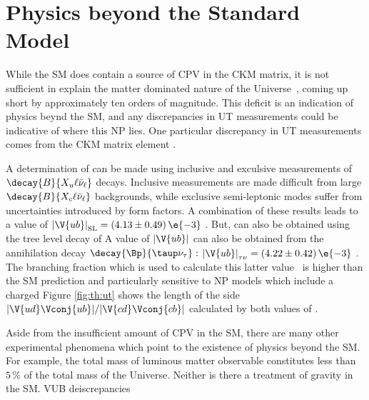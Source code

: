 \section{Physics beyond the Standard Model}

While the SM does contain a source of CPV in the CKM matrix, it is not sufficient in explain the
matter dominated nature of the Universe~\cite{Cline:2006ts,Huet:1994jb}, coming up short by
approximately ten orders of magnitude.
This deficit is an indication of physics beynd the SM, and any discrepancies in UT measurements
could be indicative of where this NP lies.
One particular discrepancy in UT measurements comes from the CKM matrix element .

A determination of 
can be made using inclusive and exculsive measurements of
$\decay{B}{X_u\ell\bar\nu_\ell}$ decays.
Inclusive measurements are made difficult from large
$\decay{B}{X_c\ell\bar\nu_\ell}$ backgrounds, while exclusive semi-leptonic modes suffer from
uncertainties introduced by form factors.
A combination of these results leads to a value of
$\left|\V{ub}\right|_\mathrm{SL}=\left(4.13\pm0.49\right)\e{-3}$ \cite{PDG2012}.
But,  can also be obtained using the tree level decay of
A value of $\left|\V{ub}\right|$ can also be obtained from the annihilation decay
$\decay{\Bp}{\taup\nu_\tau}:$
$\left|\V{ub}\right|_{\tau\nu}=\left(4.22\pm0.42\right)\e{-3}$ \cite{PDG2012}.
The branching fraction which is used to calculate this latter value~\cite{Amhis:2012bh} is
higher than the SM prediction and particularly sensitive to NP models which include a charged
Figure \ref{fig:th:ut} shows the length of the side $|\V{ud}\Vconj{ub}|/|\V{cd}\Vconj{cb}|$
calculated by both values of .

Aside from the insufficient amount of CPV in the SM,
there are many other experimental phenomena which point to the existence of physics beyond the SM.
For example, the total mass of luminous matter observable constitutes less than $5\,\%$ of the
total mass of the Universe.
Neither is there a treatment of gravity in the SM.
\cite{Crivellin:2014zpa} VUB deiscrepancies

